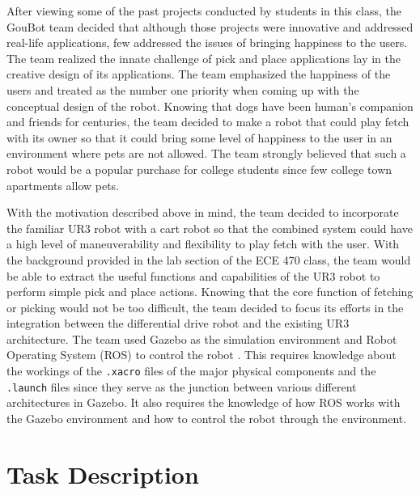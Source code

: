     After viewing some of the past projects conducted by students in this class, the GouBot team decided that although those projects were innovative and addressed real-life applications, few addressed the issues of bringing happiness to the users. The team realized the innate challenge of pick and place applications lay in the creative design of its applications. The team emphasized the happiness of the users and treated as the number one priority when coming up with the conceptual design of the robot. Knowing that dogs have been human's companion and friends for centuries, the team decided to make a robot that could play fetch with its owner so that it could bring some level of happiness to the user in an environment where pets are not allowed. The team strongly believed that such a robot would be a popular purchase for college students since few college town apartments allow pets. 

    With the motivation described above in mind, the team decided to incorporate the familiar UR3 robot with a cart robot so that the combined system could have a high level of maneuverability and flexibility to play fetch with the user. With the background provided in the lab section of the ECE 470 class, the team would be able to extract the useful functions and capabilities of the UR3 robot to perform simple pick and place actions. Knowing that the core function of fetching or picking would not be too difficult, the team decided to focus its efforts in the integration between the differential drive robot and the existing UR3 architecture. The team used Gazebo as the simulation environment and Robot Operating System (ROS) to control the robot \cite{ros_concept}. This requires knowledge about the workings of the \lstinline!.xacro! files of the major physical components and the \lstinline!.launch! files since they serve as the junction between various different architectures in Gazebo. It also requires the knowledge of how ROS works with the Gazebo environment and how to control the robot through the environment.

\newpage
\section{Task Description} \label{sec:task_desc}
    
    
